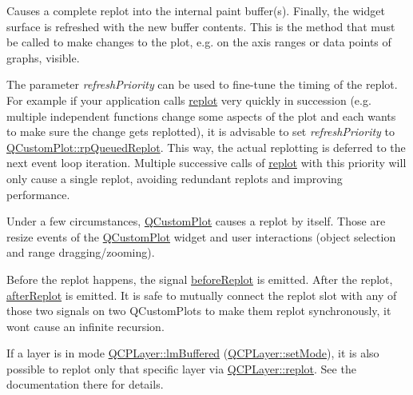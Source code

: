 Causes a complete replot into the internal paint buffer(s). Finally, the widget surface is refreshed with the new buffer contents. This is the method that must be called to make changes to the plot, e.\+g. on the axis ranges or data points of graphs, visible.

The parameter {\itshape refresh\+Priority} can be used to fine-\/tune the timing of the replot. For example if your application calls \mbox{\hyperlink{class_q_custom_plot_aa4bfe7d70dbe67e81d877819b75ab9af}{replot}} very quickly in succession (e.\+g. multiple independent functions change some aspects of the plot and each wants to make sure the change gets replotted), it is advisable to set {\itshape refresh\+Priority} to \mbox{\hyperlink{class_q_custom_plot_a45d61392d13042e712a956d27762aa39a019650c6ddf308f97e811fbfff207a8f}{Q\+Custom\+Plot\+::rp\+Queued\+Replot}}. This way, the actual replotting is deferred to the next event loop iteration. Multiple successive calls of \mbox{\hyperlink{class_q_custom_plot_aa4bfe7d70dbe67e81d877819b75ab9af}{replot}} with this priority will only cause a single replot, avoiding redundant replots and improving performance.

Under a few circumstances, \mbox{\hyperlink{class_q_custom_plot}{Q\+Custom\+Plot}} causes a replot by itself. Those are resize events of the \mbox{\hyperlink{class_q_custom_plot}{Q\+Custom\+Plot}} widget and user interactions (object selection and range dragging/zooming).

Before the replot happens, the signal \mbox{\hyperlink{class_q_custom_plot_a0cd30e29b73efd6afe096e44bc5956f5}{before\+Replot}} is emitted. After the replot, \mbox{\hyperlink{class_q_custom_plot_a6f4fa624af060bc5919c5f266cf426a0}{after\+Replot}} is emitted. It is safe to mutually connect the replot slot with any of those two signals on two Q\+Custom\+Plots to make them replot synchronously, it won\textquotesingle{}t cause an infinite recursion.

If a layer is in mode \mbox{\hyperlink{class_q_c_p_layer_a67dcfc1590be2a1f2227c5a39bb59c7cab581b9fab3007c4c65f057f4185d7538}{Q\+C\+P\+Layer\+::lm\+Buffered}} (\mbox{\hyperlink{class_q_c_p_layer_a938d57b04f4e4c23cedf1711f983919b}{Q\+C\+P\+Layer\+::set\+Mode}}), it is also possible to replot only that specific layer via \mbox{\hyperlink{class_q_c_p_layer_adefd53b6db02f470151c416f42e37180}{Q\+C\+P\+Layer\+::replot}}. See the documentation there for details. \mbox{\label{class_q_custom_plot_ad86528f2cee6c7e446dea4a6e8839935}} 
